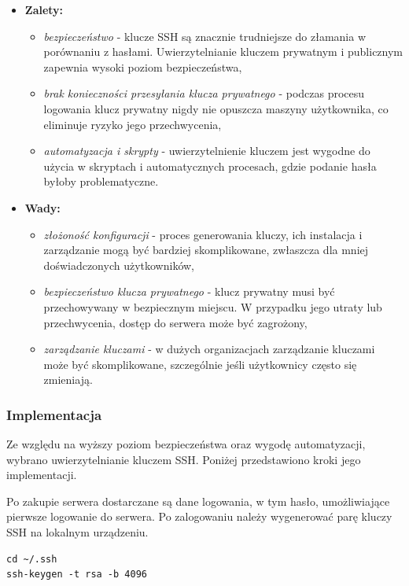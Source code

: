 \documentclass{article}
\begin{document}
\begin{itemize}
    \item \textbf{Zalety:}
    \begin{itemize}
        \item \textit{bezpieczeństwo} - klucze SSH są znacznie trudniejsze do złamania w porównaniu z hasłami. Uwierzytelnianie kluczem prywatnym i publicznym zapewnia wysoki poziom bezpieczeństwa,
        \item \textit{brak konieczności przesyłania klucza prywatnego} - podczas procesu logowania klucz prywatny nigdy nie opuszcza maszyny użytkownika, co eliminuje ryzyko jego przechwycenia,
        \item \textit{automatyzacja i skrypty} - uwierzytelnienie kluczem jest wygodne do użycia w skryptach i automatycznych procesach, gdzie podanie hasła byłoby problematyczne.
    \end{itemize}
    \item \textbf{Wady:}
    \begin{itemize}
        \item \textit{złożoność konfiguracji} - proces generowania kluczy, ich instalacja i zarządzanie mogą być bardziej skomplikowane, zwłaszcza dla mniej doświadczonych użytkowników,
        \item \textit{bezpieczeństwo klucza prywatnego} - klucz prywatny musi być przechowywany w bezpiecznym miejscu. W przypadku jego utraty lub przechwycenia, dostęp do serwera może być zagrożony,
        \item \textit{zarządzanie kluczami} - w dużych organizacjach zarządzanie kluczami może być skomplikowane, szczególnie jeśli użytkownicy często się zmieniają.
    \end{itemize}
\end{itemize}

\subsubsection{Implementacja}

Ze względu na wyższy poziom bezpieczeństwa oraz wygodę automatyzacji, wybrano uwierzytelnianie kluczem SSH. Poniżej przedstawiono kroki jego implementacji.

Po zakupie serwera dostarczane są dane logowania, w tym hasło, umożliwiające pierwsze logowanie do serwera. Po zalogowaniu należy wygenerować parę kluczy SSH na lokalnym urządzeniu.

\begin{lstlisting}[caption=Wygenerowanie pary kluczy na swojej maszynie]
cd ~/.ssh
ssh-keygen -t rsa -b 4096
\end{lstlisting}
\end{document}
